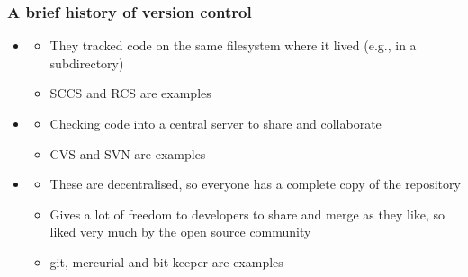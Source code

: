 \documentclass[hyperref={colorlinks=true}]{beamer}
\begin{document}

\begin{frame}%
  \frametitle{A brief history of version control}
  
  \begin{itemize}
    \item {}
    \begin{itemize}
      \item They tracked code on the same filesystem where it lived (e.g., in a subdirectory)
      \item SCCS and RCS are examples
    \end{itemize}
    \item {}
    \begin{itemize}
      \item Checking code into a central server to share and collaborate
      \item CVS and SVN are examples
    \end{itemize}
    \item  {}
    \begin{itemize}
      \item These are decentralised, so everyone has a complete copy of the repository
      \item Gives a lot of freedom to developers to share and merge as they like, so liked very much by the open source community
      \item git, mercurial and bit keeper are examples
    \end{itemize}
  \end{itemize}
  
\end{frame}

\end{document}
